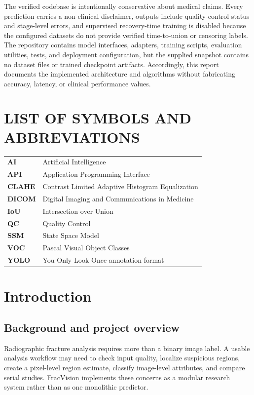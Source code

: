 \documentclass[12pt,a4paper]{article}
\begin{document}
The verified codebase is intentionally conservative about medical claims. Every prediction carries a non-clinical disclaimer, outputs include quality-control status and stage-level errors, and supervised recovery-time training is disabled because the configured datasets do not provide verified time-to-union or censoring labels. The repository contains model interfaces, adapters, training scripts, evaluation utilities, tests, and deployment configuration, but the supplied snapshot contains no dataset files or trained checkpoint artifacts. Accordingly, this report documents the implemented architecture and algorithms without fabricating accuracy, latency, or clinical performance values.

\newpage
\tableofcontents
\newpage
\listoffigures
\newpage
\listoftables
\newpage
\section*{LIST OF SYMBOLS AND ABBREVIATIONS}
\begin{tabularx}{\textwidth}{>{\bfseries}lX}
AI & Artificial Intelligence\\
API & Application Programming Interface\\
CLAHE & Contrast Limited Adaptive Histogram Equalization\\
DICOM & Digital Imaging and Communications in Medicine\\
IoU & Intersection over Union\\
QC & Quality Control\\
SSM & State Space Model\\
VOC & Pascal Visual Object Classes\\
YOLO & You Only Look Once annotation format
\end{tabularx}

\clearpage
{}
\section{Introduction}
\subsection{Background and project overview}
Radiographic fracture analysis requires more than a binary image label. A usable analysis workflow may need to check input quality, localize suspicious regions, create a pixel-level region estimate, classify image-level attributes, and compare serial studies. FracVision implements these concerns as a modular research system rather than as one monolithic predictor.
\end{document}
